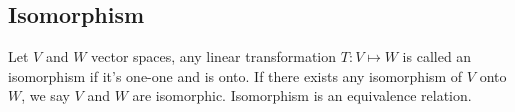\documentclass[../main.tex]{subfiles}
\begin{document}
\subsection{Isomorphism}
Let $V$ and $W$ vector spaces, any linear transformation $T:V\mapsto W$ is called an isomorphism if it's one-one and is onto. If there exists any isomorphism of $V$ onto $W$, we say $V$ and $W$ are isomorphic. Isomorphism is an equivalence relation.
\end{document}
